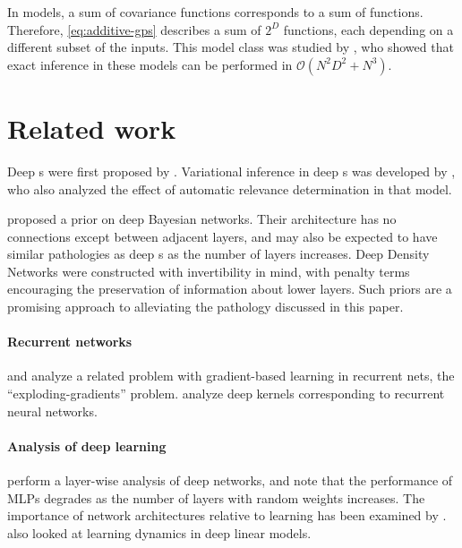 \documentclass[twoside]{article}
\makeatletter
\newlength{\nonHumbleHeight}
\def\@humbleformat#1{{\settoheight{\nonHumbleHeight}{#1}\resizebox{!}{0.94\nonHumbleHeight}{#1}}}%
\newcommand\humble[1]{{\@humbleformat{#1}}}%
\newcommand{\gp}{{\humble{GP}}}
\newcommand{\sectiondist}{}
\makeatother
\begin{document}
In \gp{} models, a sum of covariance functions corresponds to a sum of functions.  Therefore, \eqref{eq:additive-gps} describes a sum of $2^D$ functions, each depending on a different subset of the inputs.
This model class was studied by \citet{duvenaud2011additive11}, who showed that exact inference in these models can be performed in $\mathcal{O}(N^2 D^2 + N^3)$.

\section{Related work}
\sectiondist

Deep \gp{}s were first proposed by \cite{lawrence2007hierarchical}. Variational inference in deep \gp{}s was developed by \cite{damianou2012deep}, who also analyzed the effect of automatic relevance determination in that model.

\citet{adams2010learning} proposed a prior on deep Bayesian networks.  Their architecture has no connections except between adjacent layers, and may also be expected to have similar pathologies as deep \gp{}s as the number of layers increases.
%
Deep Density Networks \citep{rippel2013high} were constructed with invertibility in mind, with penalty terms encouraging the preservation of information about lower layers. Such priors are a promising approach to alleviating the pathology discussed in this paper.

\paragraph{Recurrent networks}
\cite{bengio1994learning} and \cite{pascanu2012understanding} analyze a related problem with gradient-based learning in recurrent nets, the ``exploding-gradients'' problem.
\cite{hermans2012recurrent} analyze deep kernels corresponding to recurrent neural networks.

\paragraph{Analysis of deep learning}
\cite{montavon2010layer} perform a layer-wise analysis of deep networks, and note that the performance of MLPs degrades as the number of layers with random weights increases.
The importance of network architectures relative to learning has been examined by \cite{saxe2011random}.
\cite{saxedynamics} also looked at learning dynamics in deep linear models.  
\end{document}
